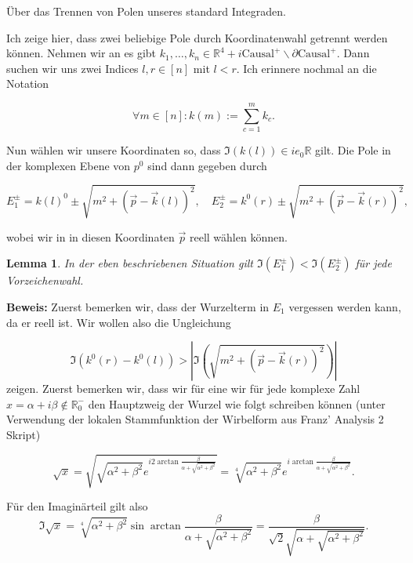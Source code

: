 \documentclass[a4paper,12pt]{article}
\newtheorem{lemma}{Lemma}
\begin{document}
Über das Trennen von Polen unseres standard Integraden.


Ich zeige hier, dass zwei beliebige Pole durch Koordinatenwahl getrennt werden können. Nehmen wir an es gibt \(k_1,\dots, k_n \in \mathbb{R}^4+i \text{Causal}^+\backslash \partial\text{Causal}^+\). Dann suchen wir uns zwei Indices \(l,r\in [n]\) mit \(l<r\). Ich erinnere nochmal an die Notation

\begin{equation}
\forall m\in [n]: k(m):=\sum_{c=1}^m k_c.
\end{equation}

Nun wählen wir unsere Koordinaten so, dass \(\Im (k(l)) \in i e_0 \mathbb{R}\) gilt. Die Pole in der komplexen Ebene von \(p^0\) sind dann gegeben durch

\begin{equation}
E_1^\pm = k(l)^0 \pm \sqrt{m^2 + (\vec{p}-\vec{k}(l))^2}, \quad E_2^\pm =k^0(r) \pm \sqrt{m^2 + (\vec{p}-\vec{k}(r))^2},
\end{equation}

wobei wir in in diesen Koordinaten \(\vec{p}\) reell wählen können.

\begin{lemma}
In der eben beschriebenen Situation gilt \(\Im (E_1^\pm)<\Im (E_2^\pm) \) für jede Vorzeichenwahl.
\end{lemma}
\textbf{ Beweis:} Zuerst bemerken wir, dass der Wurzelterm in \(E_1\) vergessen werden kann, da er reell ist. Wir wollen also die Ungleichung

\begin{equation}\label{Ung}
\Im (k^0(r)-k^0(l))> \left| \Im\left(\sqrt{m^2+(\vec{p}-\vec{k}(r))^2} \right) \right|
\end{equation}
zeigen. Zuerst bemerken wir, dass wir für eine wir für jede komplexe Zahl \(x=\alpha + i \beta\not \in  \mathbb{R}^-_0\) den Hauptzweig der Wurzel wie folgt schreiben können (unter Verwendung der lokalen Stammfunktion der Wirbelform aus Franz' Analysis 2 Skript)

\begin{equation}
\sqrt{x}= \sqrt{\sqrt{\alpha^2+\beta^2} e^{i 2 \arctan \frac{\beta}{\alpha+\sqrt{\alpha^2+\beta^2}}}}=\sqrt[4]{\alpha^2+\beta^2} e^{i  \arctan \frac{\beta}{\alpha+\sqrt{\alpha^2+\beta^2}}}.
\end{equation}

Für den Imaginärteil gilt also
\begin{equation}\label{imroot}
\Im \sqrt{x} = \sqrt[4]{\alpha^2+\beta^2} \sin \arctan \frac{\beta}{\alpha+\sqrt{\alpha^2+\beta^2}}=\frac{\beta}{\sqrt{2}\sqrt{\alpha + \sqrt{\alpha^2+\beta^2}}}.
\end{equation}
\end{document}

